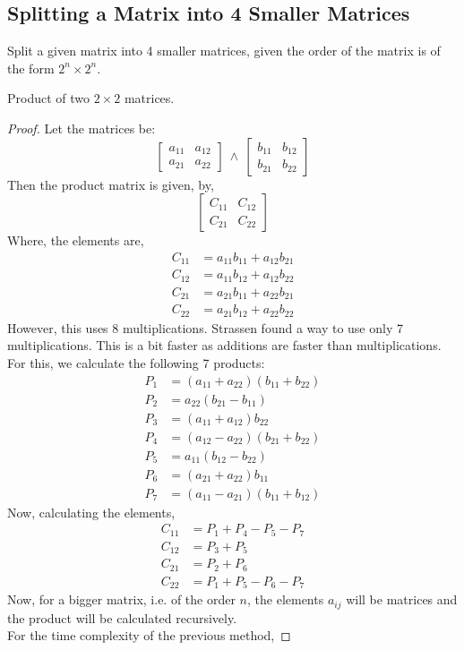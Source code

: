 \subsection{Splitting a Matrix into 4 Smaller Matrices}
\begin{eg}
	Split a given matrix into 4 smaller matrices, given the order of the matrix is of the form $2^n\times 2^n$.
\end{eg}
\begin{explanation}

\end{explanation}
\begin{theorem}
	Product of two $2\times 2$ matrices.
\end{theorem}
\begin{proof}
	Let the matrices be:\\
	\[\begin{bmatrix}a_{11}&a_{12}\\ a_{21}&a_{22}\end{bmatrix} \ \land \ \begin{bmatrix} b_{11}&b_{12}\\b_{21}&b_{22}\end{bmatrix}\]
	Then the product matrix is given, by,
	\[\begin{bmatrix} C_{11}& C_{12} \\ C_{21} & C_{22} \end{bmatrix}\]
	Where, the elements are,
	\[\begin{split}
			C_{11}&=a_{11}b_{11}+a_{12}b_{21} \\
			C_{12}&=a_{11}b_{12}+a_{12}b_{22}\\
			C_{21}&=a_{21}b_{11}+a_{22}b_{21}\\
			C_{22}&=a_{21}b_{12}+a_{22}b_{22}
		\end{split}\]
	However, this uses 8 multiplications. Strassen found a way to use only 7 multiplications. This is a bit faster as additions are faster than multiplications.
	For this, we calculate the following 7 products:
	\[\begin{split}
			P_1&=(a_{11}+a_{22})(b_{11}+b_{22})\\
			P_2&=a_{22}(b_{21}-b_{11})\\
			P_3&=(a_{11}+a_{12})b_{22}\\
			P_4&=(a_{12}-a_{22})(b_{21}+b_{22})\\
			P_5&=a_{11}(b_{12}-b_{22})\\
			P_6&=(a_{21}+a_{22})b_{11}\\
			P_7&=(a_{11}-a_{21})(b_{11}+b_{12})
		\end{split}\]
	Now, calculating the elements,
	\[\begin{split}
			C_{11}&=P_1+P_4-P_5-P_7\\
			C_{12}&=P_3+P_5\\
			C_{21}&=P_2+P_6\\
			C_{22}&=P_1+P_5-P_6-P_7
		\end{split}\]
	Now, for a bigger matrix, i.e. of the order $n$, the elements $a_{ij}$ will be matrices and the product will be calculated recursively.\\
	For the time complexity of the previous method,


\end{proof}
